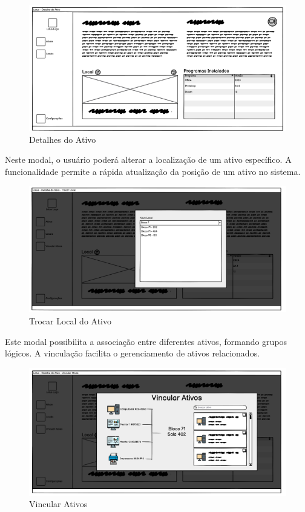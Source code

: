\begin{figure}[H]
    \centering
    \includegraphics[width=1\linewidth]{figuras/detalhesativo.png}
    \caption{Detalhes do Ativo}
    \label{fig:mockup2}
\end{figure}

Neste modal, o usuário poderá alterar a localização de um ativo específico. A funcionalidade permite a rápida atualização da posição de um ativo no sistema.


\begin{figure}[H]
    \centering
    \includegraphics[width=1\linewidth]{figuras/trocarativo.png}
    \caption{Trocar Local do Ativo}
    \label{fig:mockup3}
\end{figure}

Este modal possibilita a associação entre diferentes ativos, formando grupos lógicos. A vinculação facilita o gerenciamento de ativos relacionados.


\begin{figure}[H]
    \centering
    \includegraphics[width=1\linewidth]{figuras/vincularativo.png}
    \caption{Vincular Ativos}
    \label{fig:mockup3}
\end{figure}

